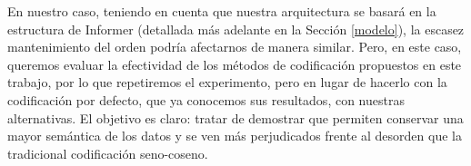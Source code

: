 En nuestro caso, teniendo en cuenta que nuestra arquitectura se basará en la estructura de Informer (detallada más adelante en la Sección \ref{modelo}), la escasez mantenimiento del orden podría afectarnos de manera similar. Pero, en este caso, queremos evaluar la efectividad de los métodos de codificación propuestos en este trabajo, por lo que repetiremos el experimento, pero en lugar de hacerlo con la codificación por defecto, que ya conocemos sus resultados, con nuestras alternativas. El objetivo es claro: tratar de demostrar que permiten conservar una mayor semántica de los datos y se ven más perjudicados frente al desorden que la tradicional codificación seno-coseno.
